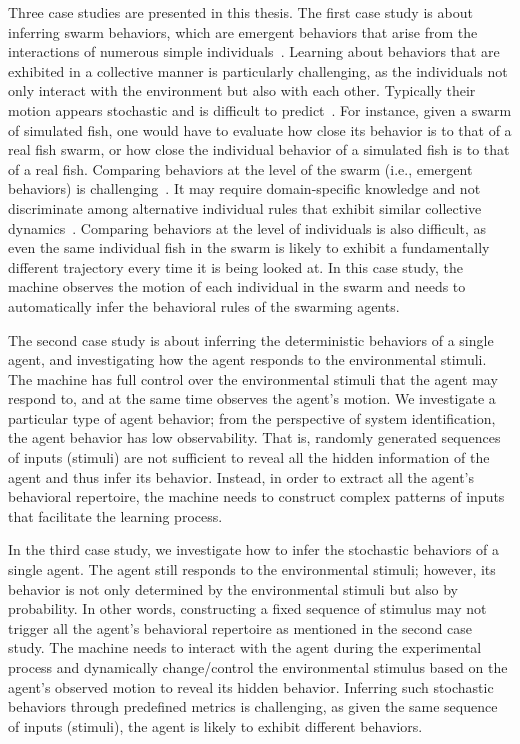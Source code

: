 Three case studies are presented in this thesis. The first case study is about inferring swarm behaviors, which are emergent behaviors that arise from the interactions of numerous simple individuals~\cite{Camazine2001}. Learning about behaviors that are exhibited in a collective manner is particularly challenging, as the individuals not only interact with the environment but also with each other. Typically their motion appears stochastic and is difficult to predict~\cite{Dirk2011}. For instance, given a swarm of simulated fish, one would have to evaluate how close its behavior is to that of a real fish swarm, or how close the individual behavior of a simulated fish is to that of a real fish. Comparing behaviors at the level of the swarm (i.e., emergent behaviors) is challenging~\cite{Harvey:SI:2015}. It may require domain-specific knowledge and not discriminate among alternative individual rules that exhibit similar collective dynamics~\cite{Weitz2012}. Comparing behaviors at the level of individuals is also difficult, as even the same individual fish in the swarm is likely to exhibit a fundamentally different trajectory every time it is being looked at. In this case study, the machine observes the motion of each individual in the swarm and needs to automatically infer the behavioral rules of the swarming agents.

The second case study is about inferring the deterministic behaviors of a single agent, and investigating how the agent responds to the environmental stimuli. The machine has full control over the environmental stimuli that the agent may respond to, and at the same time observes the agent's motion. We investigate a particular type of agent behavior; from the perspective of system identification, the agent behavior has low observability. That is, randomly generated sequences of inputs (stimuli) are not sufficient to reveal all the hidden information of the agent and thus infer its behavior. Instead, in order to extract all the agent's behavioral repertoire, the machine needs to construct complex patterns of inputs that facilitate the learning process. 

In the third case study, we investigate how to infer the stochastic behaviors of a single agent. The agent still responds to the environmental stimuli; however, its behavior is not only determined by the environmental stimuli but also by probability. In other words, constructing a fixed sequence of stimulus may not trigger all the agent's behavioral repertoire as mentioned in the second case study. The machine needs to interact with the agent during the experimental process and dynamically change/control the environmental stimulus based on the agent's observed motion to reveal its hidden behavior. Inferring such stochastic behaviors through predefined metrics is challenging, as given the same sequence of inputs (stimuli), the agent is likely to exhibit different behaviors. 

